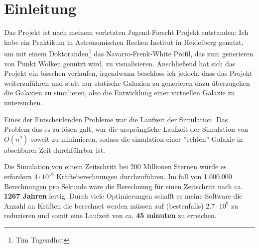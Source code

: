 \section{Einleitung}
Das Projekt ist nach meinem vorletzten Jugend-Forscht Projekt entstanden: Ich
habe ein Praktikum in Astronomischen Rechen Institut in Heidelberg genutzt, um
mit einem Doktoranden\footnote{Tim Tugendhat} das Navarro-Frenk-White Profil,
das zum generieren von Punkt Wolken genutzt wird, zu visualisieren. Anschließend
hat sich das Projekt ein bisschen verlaufen, irgendwann beschloss ich jedoch,
dass das Projekt weiterzuführen und statt nur statische Galaxien zu generieren
dazu überzugehen die Galaxien zu simulieren, also die Entwicklung einer
virtuellen Galaxie zu untersuchen.\\\par
Eines der Entscheidenden Probleme war die Laufzeit der Simulation. Das Problem
das es zu lösen galt, war die ursprüngliche Laufzeit der Simulation von
\(O(n^2)\) soweit zu minimieren, sodass die simulation einer ''echten''
Galaxie in absehbarer Zeit durchführbar ist.\\\par
Die Simulation von einem Zeitschritt bei 200 Millionen Sternen würde es
erfordern \(4 \cdot 10^{16} \) Kräfteberechnungen durchzuführen. Im fall von
1.000.000 Berechnungen pro Sekunde wäre die Berechnung für einen Zeitschritt
nach ca. \textbf{1267 Jahren} fertig. Durch viele Optimierungen schafft es
meine Software die Anzahl an Kräften die berechnet werden müssen auf
(bestenfalls) \( 2.7 \cdot 10^{9} \) zu reduzieren und somit eine Laufzeit von
ca. \textbf{45 minuten} zu erreichen.

